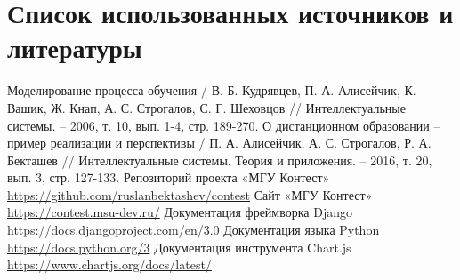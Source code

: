 \documentclass[12pt, a4paper, oneside]{article}
\begin{document}
\section{Список использованных источников и литературы}
\begingroup
\renewcommand{\section}[2]{}%
\begin{thebibliography}{20}
    Моделирование процесса обучения / В. Б. Кудрявцев, П. А. Алисейчик, К. Вашик, Ж. Кнап, А. С. Строгалов, С. Г. Шеховцов // Интеллектуальные системы. – 2006, т. 10, вып. 1-4, стр. 189-270.
    О дистанционном образовании – пример реализации и перспективы / П. А. Алисейчик, А. С. Строгалов, Р. А. Бекташев // Интеллектуальные системы. Теория и приложения. – 2016, т. 20, вып. 3, стр. 127-133.
    Репозиторий проекта «МГУ Контест»\\
    \url{https://github.com/ruslanbektashev/contest}
    Сайт «МГУ Контест»\\
    \url{https://contest.msu-dev.ru/}
    Документация фреймворка Django\\
    \url{https://docs.djangoproject.com/en/3.0}
    Документация языка Python\\
    \url{https://docs.python.org/3}
    Документация инструмента Chart.js\\
    \url{https://www.chartjs.org/docs/latest/}
\end{thebibliography}
\endgroup
\end{document}
